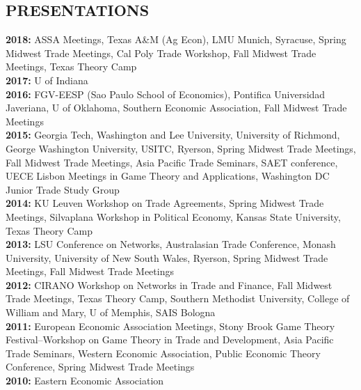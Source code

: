 \documentclass[11pt]{res}
\begin{document}
\begin{resume}
\section{PRESENTATIONS}\vspace{1.5mm}
{\bf 2018:} ASSA Meetings, Texas A\&M (Ag Econ), LMU Munich, Syracuse, Spring Midwest Trade Meetings, Cal Poly Trade Workshop, Fall Midwest Trade Meetings, Texas Theory Camp \vspace{1.5mm}\\
{\bf 2017:} U of Indiana \vspace{1.5mm}\\
{\bf 2016:} FGV-EESP (Sao Paulo School of Economics), Pontifica Universidad Javeriana, U of Oklahoma, Southern Economic Association, Fall Midwest Trade Meetings\vspace{1.5mm}\\
{\bf 2015:} Georgia Tech, Washington and Lee University, University of Richmond, George Washington University, USITC, Ryerson, Spring Midwest Trade Meetings, Fall Midwest Trade Meetings, Asia Pacific Trade Seminars, SAET conference, UECE Lisbon Meetings in Game Theory and Applications, Washington DC Junior Trade Study Group\vspace{1.5mm}\\
{\bf 2014:} KU Leuven Workshop on Trade Agreements, Spring Midwest Trade Meetings, Silvaplana Workshop in Political Economy, Kansas State University, Texas Theory Camp\vspace{1.5mm}\\
{\bf 2013:} LSU Conference on Networks, Australasian Trade Conference, Monash University, University of New South Wales, Ryerson, Spring Midwest Trade Meetings, Fall Midwest Trade Meetings \vspace{1.5mm}\\
{\bf 2012:}  CIRANO Workshop on Networks in Trade and Finance, Fall Midwest Trade Meetings, Texas Theory Camp, Southern Methodist University, College of William and Mary, U of Memphis, SAIS Bologna\vspace{1.5mm}\\
{\bf 2011:} European Economic Association Meetings, Stony Brook Game Theory Festival--Workshop on Game Theory in Trade and Development, Asia Pacific Trade Seminars, Western Economic Association, Public Economic Theory Conference, Spring Midwest Trade Meetings\vspace{1.5mm}\\
{\bf 2010:} Eastern Economic Association


\end{resume}
\end{document}
